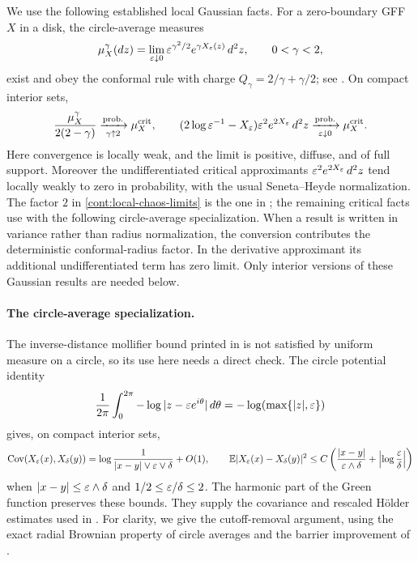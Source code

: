 We use the following established local Gaussian facts.  For a zero-boundary
GFF $X$ in a disk, the circle-average measures
\[
 \mu_X^\gamma(dz)
   =\lim_{\varepsilon\downarrow0}
      \varepsilon^{\gamma^2/2}e^{\gamma X_\varepsilon(z)}\,d^2z,
       \qquad 0<\gamma<2,
\]
exist and obey the conformal rule with charge $Q_\gamma=2/\gamma+\gamma/2$;
see \cite[Propositions 1.1 and 2.1]{DSKPZ}.  On compact interior sets,
\begin{equation}\label{cont:local-chaos-limits}
 \frac{\mu_X^\gamma}{2(2-\gamma)}
     \xrightarrow[\gamma\uparrow2]{\mathrm{prob.}}\mu_X^{\rm crit},
 \qquad
 (2\log\varepsilon^{-1}-X_\varepsilon)\varepsilon^2e^{2X_\varepsilon}\,d^2z
     \xrightarrow[\varepsilon\downarrow0]{\mathrm{prob.}}\mu_X^{\rm crit}.
\end{equation}
Here convergence is locally weak, and the limit is positive, diffuse, and of
full support.  Moreover the undifferentiated critical approximants
$\varepsilon^2e^{2X_\varepsilon}\,d^2z$ tend locally weakly to zero in probability, with the
usual Seneta--Heyde normalization.  The factor $2$ in
\eqref{cont:local-chaos-limits} is the one in
\cite[Theorem 1.1]{APS}; the remaining critical facts use
\cite{Powell,DRSV,DRSVderivative} with the following circle-average
specialization.
When a result is written in variance rather than radius normalization, the
conversion contributes the deterministic conformal-radius factor.  In the
derivative approximant its additional undifferentiated term has zero limit.
Only interior versions of these Gaussian results are needed below.

\paragraph{The circle-average specialization.}
The inverse-distance mollifier bound printed in \cite[Equation~(1.2)]{Powell}
is not satisfied by uniform measure on a circle, so its use here needs a
direct check. The circle potential identity
\[
 \frac1{2\pi}\int_0^{2\pi}-\log|z-\varepsilon e^{i\theta}|\,d\theta
       =-\log(\max\{|z|,\varepsilon\})
\]
gives, on compact interior sets,
\[
 \operatorname{Cov}(X_\varepsilon(x),X_\delta(y))
 =\log\frac1{|x-y|\vee\varepsilon\vee\delta}+O(1),\qquad
 \mathbb E|X_\varepsilon(x)-X_\delta(y)|^2
 \le C\left(\frac{|x-y|}{\varepsilon\wedge\delta}
                   +\left|\log\frac{\varepsilon}\delta\right|\right)
\]
when $|x-y|\le\varepsilon\wedge\delta$ and $1/2\le\varepsilon/\delta\le2$.
The harmonic part of the Green function preserves these bounds. They supply
the covariance and rescaled H\"older estimates used in
\cite[Lemmas~2.1 and~2.3]{Powell}. For clarity, we give the cutoff-removal argument, using the exact radial
Brownian property of circle averages \cite[Lemma~3.1]{Powell} and the barrier
improvement of \cite[Appendix~A.1]{LacoinCritical}.

